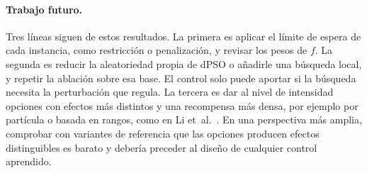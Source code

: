 \documentclass[10pt,a4paper]{article}
\begin{document}
\paragraph{Trabajo futuro.}
Tres líneas siguen de estos resultados. La primera es aplicar el límite de espera de cada
instancia, como restricción o penalización, y revisar los pesos de $f$. La segunda es reducir la
aleatoriedad propia de dPSO o añadirle una búsqueda local, y repetir la ablación sobre esa base.
El control solo puede aportar si la búsqueda necesita la perturbación que regula. La tercera es
dar al nivel de intensidad opciones con efectos más distintos y una recompensa más densa, por
ejemplo por partícula o basada en rangos, como en Li et~al.~\cite{li2014}. En una perspectiva más
amplia, comprobar con variantes de referencia que las opciones producen efectos distinguibles es
barato y debería preceder al diseño de cualquier control aprendido.
\end{document}

